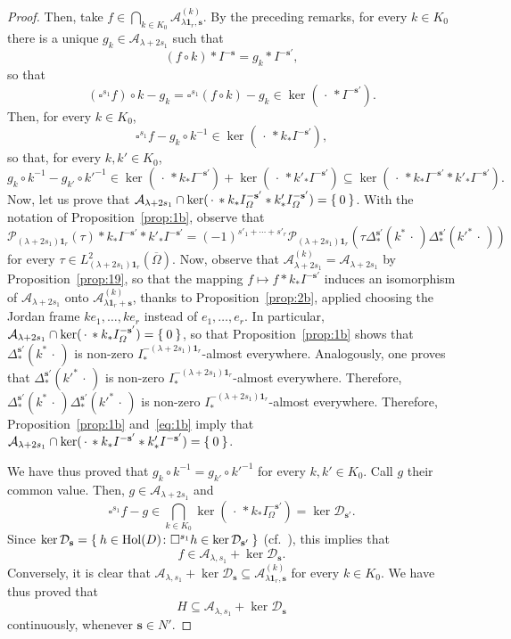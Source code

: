 \documentclass[10.5pt,reqno]{amsart}
\newcommand{\Hol}{\mathrm{Hol}}
\newcommand{\vect}[1]{\mathbf{{#1}}}
\newcommand{\Ac}{\mathcal{A}}
\newcommand{\Dc}{\mathcal{D}}
\newcommand{\Pc}{\mathcal{P}}
\begin{document}
\begin{proof}
	Then, take $f\in \bigcap_{k\in K_0} \Ac_{\lambda \vect 1_r,\vect s}^{(k)}$. By the preceding remarks, for every $k\in K_0$ there is a unique $g_k\in \Ac_{\lambda +2s_1}$ such that
	\[
	(f\circ k)*I^{-\vect s}=g_k*I^{-\vect s'},
	\]
	so that  
	\[
	(\square^{s_1}f)\circ k-g_k=\square^{s_1}(f\circ k)-g_k\in \ker(\,\cdot\,* I^{-\vect s'}).
	\]
	Then, for every $k\in K_0$,
	\[
	\square^{s_1}f-g_k\circ k^{-1}\in \ker (\,\cdot\,* k_* I^{-\vect s'}),
	\]
	so that, for every $k,k'\in K_0$,
	\[
	g_k\circ k^{-1}-g_{k'}\circ k'^{-1}\in \ker (\,\cdot\,* k_* I^{-\vect s'})+\ker (\,\cdot\,* k'_* I^{-\vect s'})\subseteq \ker (\,\cdot\,* k_* I^{-\vect s'}* k'_* I^{-\vect s'}).
	\]
	Now, let us prove that $\Ac_{\lambda+2 s_1}\cap \ker (\,\cdot\,* k_* I^{-\vect s'}_\Omega* k'_* I^{-\vect s'}_\Omega)=\Set{0}$. With the notation of Proposition~\ref{prop:1b}, observe that
	\begin{equation}\label{eq:1b}
	\Pc_{(\lambda+2 s_1)\vect 1_r}(\tau)*k_* I^{-\vect s'}* k'_* I^{-\vect s'}= (-1)^{s'_1+\cdots +s'_r}\Pc_{(\lambda+2 s_1)\vect 1_r}(\tau \Delta^{\vect s'}_{*}(k^*\,\cdot\,) \Delta^{\vect s'}_{*}(k'^*\,\cdot\,) )
	\end{equation}
	for every $\tau\in L^2_{(\lambda+2 s_1)\vect 1_r}(\overline{\Omega})$.
	Now, observe that $\Ac^{(k)}_{\lambda+2 s_1}=\Ac_{\lambda+2 s_1}$ by Proposition~\ref{prop:19}, so that the mapping $f\mapsto f* k_* I^{-\vect s'}$ induces an isomorphism of $\Ac_{\lambda+2 s_1}$ onto $\Ac_{\lambda \vect 1_r+\vect s}^{(k)}$, thanks to Proposition~\ref{prop:2b}, applied choosing the Jordan frame $k e_1,\dots, k e_r $ instead of $e_1,\dots,e_r$.
	In particular, $\Ac_{\lambda+2 s_1}\cap \ker (\,\cdot\,* k_* I^{-\vect s'}_\Omega)=\Set{0}$, so that 	Proposition~\ref{prop:1b} shows that $\Delta^{\vect s'}_{*}(k^*\,\cdot\,) $ is non-zero $I^{-(\lambda+2 s_1)\vect 1_r}_{*}$-almost everywhere. Analogously, one proves that $\Delta^{\vect s'}_{*}(k'^*\,\cdot\,) $ is non-zero $I^{-(\lambda+2 s_1)\vect 1_r}_{*}$-almost everywhere. Therefore, $\Delta^{\vect s'}_{*}( k^*\,\cdot\,)  \Delta^{\vect s'}_{*}(k'^*\,\cdot\,)$ is non-zero $I^{-(\lambda+2 s_1)\vect 1_r}_{*}$-almost everywhere. Therefore, Proposition~\ref{prop:1b} and~\eqref{eq:1b} imply that  $\Ac_{\lambda+2 s_1}\cap \ker (\,\cdot\,* k_* I^{-\vect s'}* k'_* I^{-\vect s'})=\Set{0}$. 
	
	We have thus proved that $g_k\circ k^{-1}=g_{k'}\circ k'^{-1} $ for every $k,k'\in K_0$. Call $g$ their common value. Then, $g\in \Ac_{\lambda+2 s_1}$ and
	\[
	\square^{s_1}f -g\in \bigcap_{k\in K_0} \ker (\,\cdot\,* k_* I^{-\vect s'}_\Omega)=\ker \Dc_{\vect s'}.
	\]
	Since $\ker \Dc_{\vect s}=\Set{h\in \Hol(D)\colon \square^{s_1}h \in \ker \Dc_{\vect s'}}$ (cf.~\cite[Theorem 9.4]{Treves}), this implies that
	\[
	f\in \Ac_{\lambda,s_1}+ \ker \Dc_{\vect s}.
	\]
	Conversely, it is clear that $\Ac_{\lambda, s_1}+ \ker \Dc_{\vect s}\subseteq \Ac_{\lambda \vect 1_r, \vect s}^{(k)}$ for every $k\in K_0$.
	We have thus proved that 
	\[
	H\subseteq \Ac_{\lambda,s_1}+ \ker \Dc_{\vect s}
	\]
	continuously, whenever $\vect s\in N'$. 


\end{proof}
\end{document}
